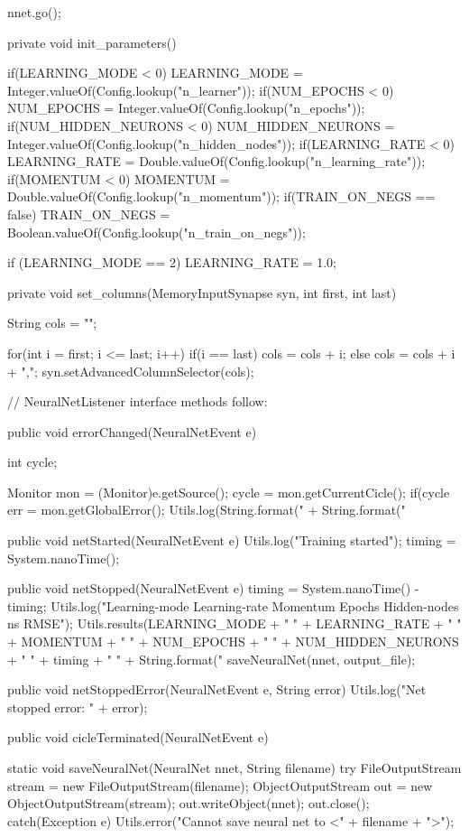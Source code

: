 \documentclass[12pt,a4,notitlepage]{report}
\renewcommand{\_}{\texttt{\symbol{95}}}
\newcommand{\<}{\texttt{\symbol{60}}}
\renewcommand{\>}{\texttt{\symbol{62}}}
\begin{document}
\begin{code}
{{		nnet.go();
	}
	
	private void init_parameters()
	{
		if(LEARNING_MODE < 0)
			LEARNING_MODE = Integer.valueOf(Config.lookup("n_learner"));
		if(NUM_EPOCHS < 0)
			NUM_EPOCHS = Integer.valueOf(Config.lookup("n_epochs"));
		if(NUM_HIDDEN_NEURONS < 0)
			NUM_HIDDEN_NEURONS = Integer.valueOf(Config.lookup("n_hidden_nodes"));
		if(LEARNING_RATE < 0)
			LEARNING_RATE = Double.valueOf(Config.lookup("n_learning_rate"));
		if(MOMENTUM < 0)
			MOMENTUM = Double.valueOf(Config.lookup("n_momentum"));
		if(TRAIN_ON_NEGS == false)
			TRAIN_ON_NEGS = Boolean.valueOf(Config.lookup("n_train_on_negs"));
		
		if (LEARNING_MODE == 2)
		{
			LEARNING_RATE = 1.0;
		}
	}
	
	private void set_columns(MemoryInputSynapse syn, int first, int last)
	{
		String cols = "";
		
		for(int i = first; i <= last; i++)
		{
			if(i == last)
				cols = cols + i;
			else
				cols = cols + i + ",";
		}
		syn.setAdvancedColumnSelector(cols);
	}
		
	// NeuralNetListener interface methods follow:
	
	public void errorChanged(NeuralNetEvent e)
	{
		int cycle;
		
		Monitor mon = (Monitor)e.getSource();
		cycle = mon.getCurrentCicle();
		if(cycle %
		{
			err = mon.getGlobalError();
			Utils.log(String.format("%
			    + String.format("%
	    }
	}
	
	public void netStarted(NeuralNetEvent e)
	{
		Utils.log("Training started");
		timing = System.nanoTime();
	}
	
	public void netStopped(NeuralNetEvent e)
	{
		timing = System.nanoTime() - timing;
		Utils.log("Learning-mode Learning-rate Momentum Epochs Hidden-nodes ns RMSE");
		Utils.results(LEARNING_MODE + " " + LEARNING_RATE + " " + MOMENTUM + " " + NUM_EPOCHS + " " + NUM_HIDDEN_NEURONS + " " + timing + " " + String.format("%
		saveNeuralNet(nnet, output_file);
	}
	
	public void netStoppedError(NeuralNetEvent e, String error)
	{
		Utils.log("Net stopped error: " + error);
	}
	
	public void cicleTerminated(NeuralNetEvent e) {}
	
	static void saveNeuralNet(NeuralNet nnet, String filename)	
	{
		try
		{
			FileOutputStream stream = new FileOutputStream(filename);
			ObjectOutputStream out = new ObjectOutputStream(stream);
			out.writeObject(nnet);
			out.close();
		}
		catch(Exception e)
		{
			Utils.error("Cannot save neural net to <" + filename + ">");
		}
	}
		
}
\end{code}
\end{document}
